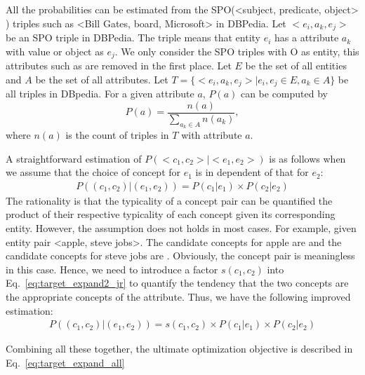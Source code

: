 All the probabilities can be estimated from the SPO(\ac{<subject, predicate, object>} ) triples such as \ac{<Bill Gates, board, Microsoft>}  in DBPedia.
Let $<e_i, a_k, e_j>$ be an SPO triple in DBPedia.
The triple means that entity $e_i$ has a attribute $a_k$ with value or object as $e_j$. 
We only consider the SPO triples with O as entity, this attributes such as  are removed in the first place.
Let $E$ be the set of all entities and $A$ be the set of all attributes.
Let $T=\{<e_i, a_k, e_j> | e_i,e_j\in E, a_k\in A\}$ be all triples in DBpedia. 
For a given attribute $a$, $P(a)$ can be computed by
\begin{equation}
\label{eq:pa}
P(a)=\frac{n(a)}{\sum_{a_k\in A}{n(a_k)}},
\end{equation}
where $n(a)$ is the count of triples in $T$ with attribute $a$.

A straightforward estimation of $P(<c_{1},c_{2}>|<e_{1},e_{2}>)$ is as follows when we assume that the choice of concept for $e_1$ is in dependent of that for $e_2$:
\begin{equation}
\label{eq:target_expand2_naive}
\begin{split}
P((c_{1},c_{2})|(e_{1},e_{2})) = P(c_1|e_1) \times P(c_2|e_2)
\end{split}
\end{equation} The rationality is that the typicality of a concept pair can be quantified the product of their respective typicality of each concept given its corresponding entity.
However, the assumption does not holds in most cases. For example, given entity pair \ac{<apple, steve jobs>}. The candidate concepts for \ac{apple} are  and the candidate concepts for \ac{steve jobs} are . Obviously, the concept pair  is meaningless in this case. Hence, we need to introduce a factor $s(c_1,c_2)$ into Eq.~\ref{eq:target_expand2_jr} to quantify the tendency that the two concepts are the appropriate concepts of the attribute. Thus, we have the following improved estimation:
\begin{equation}
\label{eq:target_expand2_jr}
\begin{split}
P((c_{1},c_{2})|(e_{1},e_{2})) = s(c_1,c_2) \times P(c_1|e_1) \times P(c_2|e_2)
\end{split}
\end{equation}


Combining all these together, the ultimate optimization objective is described in Eq.~\ref{eq:target_expand_all}

